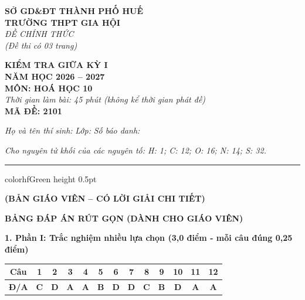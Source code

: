 \documentclass[11pt,a4paper]{article}
\begin{document}
\begin{minipage}[t]{0.48\textwidth}
\textbf{SỞ GD\&ĐT THÀNH PHỐ HUẾ}\\
\textbf{TRƯỜNG THPT GIA HỘI}\\
\textit{ĐỀ CHÍNH THỨC}\\
\textit{(Đề thi có 03 trang)}
\end{minipage}
\hfill
\begin{minipage}[t]{0.48\textwidth}
\raggedleft
\textbf{\color{hfRed}KIỂM TRA GIỮA KỲ I}\\
\textbf{NĂM HỌC 2026 -- 2027}\\
\textbf{MÔN: HOÁ HỌC 10}\\
\textit{Thời gian làm bài: 45 phút (không kể thời gian phát đề)}\\
\textbf{MÃ ĐỀ: 2101}
\end{minipage}

\vspace{4pt}
\noindent
\textit{Họ và tên thí sinh:} \dotfill \textit{Lớp:} \dotfill \textit{Số báo danh:} \dotfill

\vspace{3pt}
\noindent
\textit{\footnotesize Cho nguyên tử khối của các nguyên tố: H: 1; C: 12; O: 16; N: 14; S: 32.}

\vspace{3pt}
\hrule color{hfGreen} height 0.5pt

\vspace{4pt}
\begin{center}
\textbf{\color{hfRed}\large (BẢN GIÁO VIÊN -- CÓ LỜI GIẢI CHI TIẾT)}
\end{center}

\vspace{2pt}
\begin{center}
{\color{hfRed}\textbf{\large BẢNG ĐÁP ÁN RÚT GỌN (DÀNH CHO GIÁO VIÊN)}}
\end{center}

\vspace{2pt}
\noindent
\textbf{\color{mainGreen}1. Phần I: Trắc nghiệm nhiều lựa chọn (3,0 điểm - mỗi câu đúng 0,25 điểm)}
\begin{center}
\renewcommand{\arraystretch}{1.2}
\begin{tabular}{|c|c|c|c|c|c|c|c|c|c|c|c|c|}
\hline
\rowcolor{tableGreen}
\textbf{Câu} & \textbf{1} & \textbf{2} & \textbf{3} & \textbf{4} & \textbf{5} & \textbf{6} & \textbf{7} & \textbf{8} & \textbf{9} & \textbf{10} & \textbf{11} & \textbf{12} \\
\hline
\textbf{Đ/A} & \textbf{\color{hfRed}C} & \textbf{\color{hfRed}D} & \textbf{\color{hfRed}A} & \textbf{\color{hfRed}A} & \textbf{\color{hfRed}B} & \textbf{\color{hfRed}D} & \textbf{\color{hfRed}D} & \textbf{\color{hfRed}C} & \textbf{\color{hfRed}B} & \textbf{\color{hfRed}D} & \textbf{\color{hfRed}A} & \textbf{\color{hfRed}A} \\
\hline
\end{tabular}
\end{center}
\end{document}
